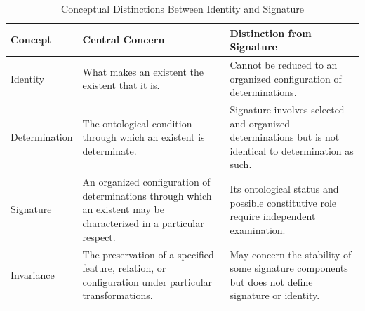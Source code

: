 %
%
%
%
%

\begin{table}[htbp]
    \centering
    \caption{Conceptual Distinctions Between Identity and Signature}
    \label{tab:identity-signature-conceptual-distinctions}

    \small
    \renewcommand{\arraystretch}{1.35}

    \begin{tabular}{p{} p{} p{}}
        \hline
        \textbf{Concept}
        &
        \textbf{Central Concern}
        &
        \textbf{Distinction from Signature}
        \\
        \hline

        Identity
        &
        What makes an existent the existent that it is.
        &
        Cannot be reduced to an organized configuration of determinations.
        \\

        Determination
        &
        The ontological condition through which an existent is determinate.
        &
        Signature involves selected and organized determinations but is not identical to determination as such.
        \\

        Signature
        &
        An organized configuration of determinations through which an existent may be characterized in a particular respect.
        &
        Its ontological status and possible constitutive role require independent examination.
        \\

        Invariance
        &
        The preservation of a specified feature, relation, or configuration under particular transformations.
        &
        May concern the stability of some signature components but does not define signature or identity.
        \\


\end{tabular}
\end{table}
